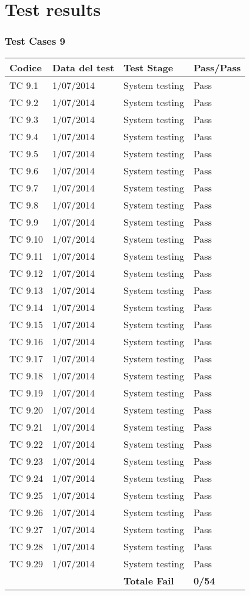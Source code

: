 \chapter{Test results}

\subsection{Test Cases 9}

\begin{longtable}{|p{3cm}|p{3cm}|p{3cm}|p{3cm}|}
	\hline
	\rowcolor{Gray}
	\textbf{Codice} & \textbf{Data del test} & \textbf{Test Stage} & \textbf{Pass/Pass}\tabularnewline
	\hline
	TC 9.1			& 1/07/2014 			& System testing		& Pass \tabularnewline
	\hline
	TC 9.2			& 1/07/2014 			& System testing		& Pass \tabularnewline
	\hline
	TC 9.3			& 1/07/2014 			& System testing		& Pass \tabularnewline
	\hline
	TC 9.4			& 1/07/2014 			& System testing		& Pass \tabularnewline
	\hline
	TC 9.5			& 1/07/2014 			& System testing		& Pass \tabularnewline
	\hline
	TC 9.6			& 1/07/2014 			& System testing		& Pass \tabularnewline
	\hline
	TC 9.7			& 1/07/2014 			& System testing		& Pass \tabularnewline
	\hline
	TC 9.8			& 1/07/2014 			& System testing		& Pass \tabularnewline
	\hline
	TC 9.9			& 1/07/2014 			& System testing		& Pass \tabularnewline
	\hline
	TC 9.10			& 1/07/2014 			& System testing		& Pass \tabularnewline
	\hline
	TC 9.11			& 1/07/2014 			& System testing		& Pass \tabularnewline
	\hline
	TC 9.12			& 1/07/2014 			& System testing		& Pass \tabularnewline
	\hline
	TC 9.13			& 1/07/2014 			& System testing		& Pass \tabularnewline
	\hline
	TC 9.14			& 1/07/2014 			& System testing		& Pass \tabularnewline
	\hline
	TC 9.15			& 1/07/2014 			& System testing		& Pass \tabularnewline
	\hline
	TC 9.16			& 1/07/2014 			& System testing		& Pass \tabularnewline
	\hline
	TC 9.17			& 1/07/2014 			& System testing		& Pass \tabularnewline
	\hline
	TC 9.18			& 1/07/2014 			& System testing		& Pass \tabularnewline
	\hline
	TC 9.19			& 1/07/2014 			& System testing		& Pass \tabularnewline
	\hline
	TC 9.20			& 1/07/2014 			& System testing		& Pass \tabularnewline
	\hline
	TC 9.21			& 1/07/2014 			& System testing		& Pass \tabularnewline
	\hline
	TC 9.22			& 1/07/2014 			& System testing		& Pass \tabularnewline
	\hline
	TC 9.23			& 1/07/2014 			& System testing		& Pass \tabularnewline
	\hline
	TC 9.24			& 1/07/2014 			& System testing		& Pass \tabularnewline
	\hline
	TC 9.25			& 1/07/2014 			& System testing		& Pass \tabularnewline
	\hline
	TC 9.26			& 1/07/2014 			& System testing		& Pass \tabularnewline
	\hline
	TC 9.27			& 1/07/2014 			& System testing		& Pass \tabularnewline
	\hline
	TC 9.28			& 1/07/2014 			& System testing		& Pass \tabularnewline
	\hline
	TC 9.29			& 1/07/2014 			& System testing		& Pass \tabularnewline
	\hline
					& 						& \textbf{Totale Fail}	& \textbf{0/54} \tabularnewline
	\hline
\end{longtable}